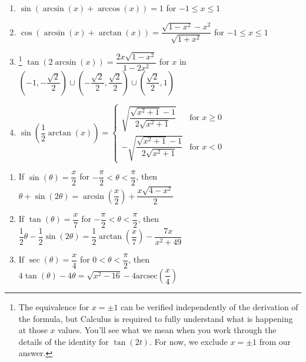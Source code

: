 \begin{enumerate}
\item $\sin \left( \arcsin(x) + \arccos(x) \right) = 1$ for $-1 \leq x \leq 1$
\item $\cos \left( \arcsin(x) + \arctan(x) \right) = \dfrac{\sqrt{1 - x^{2}} - x^{2}}{\sqrt{1 + x^{2}}}$ for $-1 \leq x \leq 1$
\item\footnote{The equivalence for $x = \pm 1$ can be verified independently of the derivation of the formula, but Calculus is required to fully understand what is happening at those $x$ values.  You'll see what we mean when you work through the details of the identity for $\tan(2t).$  For now, we exclude $x = \pm 1$ from our answer.} $\tan \left( 2\arcsin(x) \right) = \dfrac{2x\sqrt{1 - x^{2}}}{1 - 2x^{2}}$ for $x$ in $\left(-1, -\dfrac{\sqrt{2}}{2}\right) \cup \left(-\dfrac{\sqrt{2}}{2}, \dfrac{\sqrt{2}}{2} \right) \cup \left(\dfrac{\sqrt{2}}{2}, 1\right)$
\item $\sin \left( \dfrac{1}{2}\arctan(x) \right) = \left\{ \begin{array}{rr} \sqrt{\dfrac{\sqrt{x^{2} + 1} - 1}{2\sqrt{x^{2} + 1}}} & \text{for $x \geq 0$} \\ [10pt] -\sqrt{\dfrac{\sqrt{x^{2} + 1} - 1}{2\sqrt{x^{2} + 1}}} & \text{for $x < 0$}  \end{array}\right. $ 

\setcounter{HW}{\value{enumi}}

\end{enumerate}

\begin{enumerate}

\setcounter{enumi}{\value{HW}}

\item If $\sin(\theta) = \dfrac{x}{2}$ for $-\dfrac{\pi}{2} < \theta < \dfrac{\pi}{2}$, then $\theta + \sin(2\theta) = \arcsin \left( \dfrac{x}{2} \right) + \dfrac{x\sqrt{4 - x^{2}}}{2}$

\item If $\tan(\theta) = \dfrac{x}{7}$ for $-\dfrac{\pi}{2} < \theta < \dfrac{\pi}{2}$, then $\dfrac{1}{2}\theta - \dfrac{1}{2}\sin(2\theta) = \dfrac{1}{2} \arctan \left( \dfrac{x}{7} \right) - \dfrac{7x}{x^{2} + 49}$

\item If $\sec(\theta) = \dfrac{x}{4}$ for $0 < \theta < \dfrac{\pi}{2}$, then $4\tan(\theta) - 4\theta = \sqrt{x^{2} - 16} - 4\mbox{arcsec} \left( \dfrac{x}{4} \right)$

\setcounter{HW}{\value{enumi}}

\end{enumerate}


